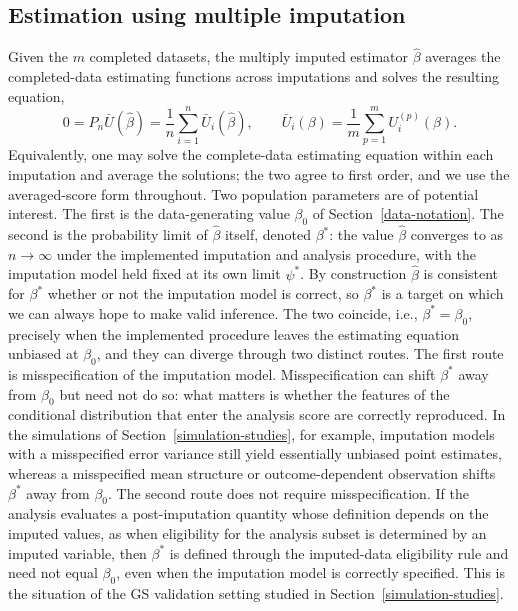 \subsection{Estimation using multiple imputation}\label{point-estimation}\label{motivating-setting}
Given the \(m\) completed datasets, the multiply imputed estimator
\(\hat\beta\) averages the completed-data estimating functions across
imputations and solves the resulting equation,
\[
0
=
P_n\bar U(\hat\beta)
=
\frac{1}{n}\sum_{i=1}^n \bar U_i(\hat\beta),
\qquad
\bar U_i(\beta)
=
\frac{1}{m}\sum_{p=1}^m U_i^{(p)}(\beta).
\]
Equivalently, one may solve the complete-data estimating equation
within each imputation and average the solutions; the two agree to
first order, and we use the averaged-score form throughout.
Two population parameters are of potential interest.  The first is the
data-generating value \(\beta_0\) of Section~\ref{data-notation}.  The
second is the probability limit of \(\hat\beta\) itself, denoted
\(\beta^\ast\): the value \(\hat\beta\) converges to as \(n\to\infty\)
under the implemented imputation and analysis procedure, with the
imputation model held fixed at its own limit \(\psi^\ast\).  By
construction \(\hat\beta\) is consistent for \(\beta^\ast\) whether or
not the imputation model is correct, so \(\beta^\ast\) is a target on
which we can always hope to make valid inference.  The two coincide,
i.e., \(\beta^\ast=\beta_0\), precisely when the implemented procedure
leaves the estimating equation unbiased at \(\beta_0\), and they can
diverge through two distinct routes.  The first route is
misspecification of the imputation model.  Misspecification can shift
\(\beta^\ast\) away from \(\beta_0\) but need not do so: what matters
is whether the features of the conditional distribution that enter the
analysis score are correctly reproduced.  In the simulations of
Section~\ref{simulation-studies}, for example, imputation models with a
misspecified error variance still yield essentially unbiased point
estimates, whereas a misspecified mean structure or outcome-dependent
observation shifts \(\beta^\ast\) away from \(\beta_0\).  The second route does not require misspecification.  If the analysis
evaluates a post-imputation quantity whose definition depends on the
imputed values, as when eligibility for the analysis subset is
determined by an imputed variable, then \(\beta^\ast\) is defined
through the imputed-data eligibility rule and need not equal
\(\beta_0\), even when the imputation model is correctly specified.
This is the situation of the GS validation setting studied in
Section~\ref{simulation-studies}.

